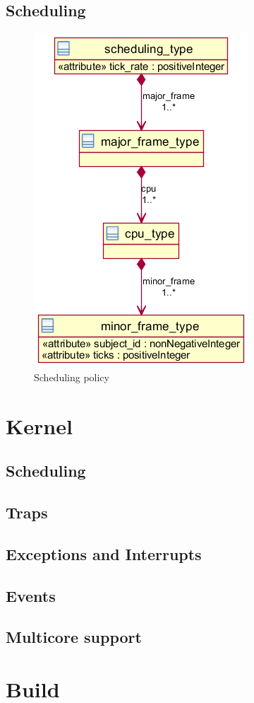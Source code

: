 \subsection{Scheduling}
\begin{figure}[h]
	\centering
	\includegraphics[scale=0.6]{images/xml_scheduling.png}
	\caption{Scheduling policy}
\end{figure}


\section{Kernel}
\subsection{Scheduling}
\subsection{Traps}
\subsection{Exceptions and Interrupts}
\subsection{Events}
\subsection{Multicore support}
\section{Build}
